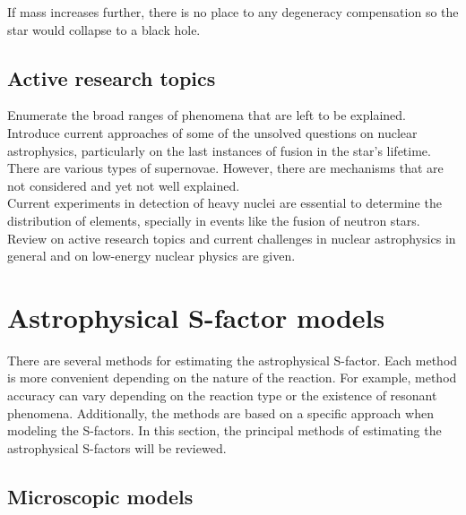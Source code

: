 \documentclass[openany]{book}
\begin{document}
If mass increases further, there is no place to any degeneracy compensation so the star would collapse to a black hole.

\section{Active research topics} \label{sec:activeResearch}

Enumerate the broad ranges of phenomena that are left to be explained.  \\

Introduce current approaches of some of the unsolved questions on nuclear astrophysics, particularly on the last instances of fusion in the star's lifetime. \\

There are various types of  supernovae. However, there are mechanisms that are not considered and yet not well explained. \\

Current experiments in detection of heavy nuclei are essential to determine the distribution of elements, specially in events like the fusion of neutron stars.\\ 

Review on active research topics and current challenges in nuclear astrophysics in general \cite{arcones_bardayan_beers_bernstein_blackmon_messer_brown_brown_brune_champagne_et_2017} and on low-energy nuclear physics \cite{carlson_carpenter_casten_elster_fallon_gade_gross_hagen_hayes_higinbotham_et_2017} are given.



\chapter{Astrophysical S-factor models} \label{ch:sfactorModels}

There are several methods for estimating the astrophysical S-factor. Each method is more convenient depending on the nature of the reaction. For example, method accuracy can vary depending on  the reaction type or the existence of resonant phenomena. Additionally, the methods are based on a specific approach when modeling the S-factors. In this section, the principal methods of estimating the astrophysical S-factors will be reviewed.

\section{Microscopic models} \label{sec:microscopicalModels}
\end{document}

